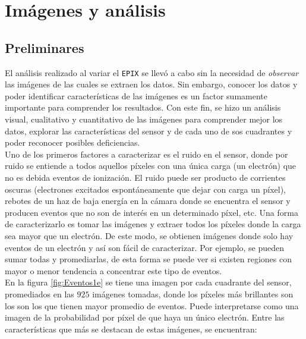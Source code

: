 \chapter{Imágenes y análisis}
\section{Preliminares}
El análisis realizado al variar el \verb|EPIX| se llevó a cabo sin la necesidad de \textit{observar} las imágenes de las cuales se extraen los datos. %
Sin embargo, conocer los datos y poder identificar características de las imágenes es un factor sumamente importante para comprender los resultados. Con este fin, se hizo un análisis visual, cualitativo y cuantitativo de las imágenes para comprender mejor los datos, explorar las características del sensor y de cada uno de sos cuadrantes y poder reconocer posibles deficiencias.\\
\indent Uno de los primeros factores a caracterizar es el ruido en el sensor, donde por ruido se entiende a todos aquellos píxeles con una única carga (un electrón) que no es debida eventos de ionización. El ruido puede ser producto de corrientes oscuras (electrones excitados espontáneamente que dejar con carga un píxel), rebotes de un haz de baja energía en la cámara donde se encuentra el sensor y producen eventos que no son de interés en un determinado píxel, etc. Una forma de caracterizarlo es tomar las imágenes y extraer todos los píxeles donde la carga sea mayor que un electrón. De este modo, se obtienen imágenes donde solo hay eventos de un electrón y así son fácil de caracterizar. Por ejemplo, se pueden sumar todas y promediarlas, de esta forma se puede ver si existen regiones con mayor o menor tendencia a concentrar este tipo de eventos.\\
\indent En la figura \ref{fig:Eventos1e} se tiene una imagen por cada cuadrante del sensor, promediados en las $925$ imágenes tomadas, donde los píxeles más brillantes son los son los que tienen mayor promedio de eventos. Puede interpretarse como una imagen de la probabilidad por píxel de que haya un único electrón. Entre las características que más se destacan de estas imágenes, se encuentran:
